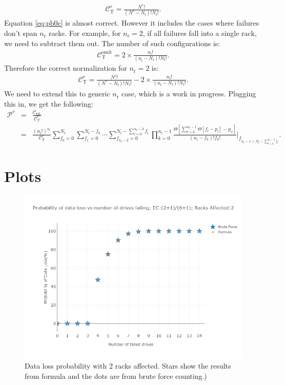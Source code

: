 \documentclass[journal]{IEEEtran}
\begin{document}
\begin{eqnarray}
\mathcal{C}^r_\text{T}=\frac{N^r!}{(N^r-N_\text{f})!N_\text{f}!}.
\label{eq:pb0c}
\end{eqnarray}
Equation \eqref{eq:pb0c} is almost correct. However it includes the cases where failures don't span \(n_\text{r}\) racks.
For example, for \(n_\text{r}=2\), if all failures fall into a single rack, we need to subtract them out. The number of such configurations is:
\begin{eqnarray}
\mathcal{C}^\text{omit}_\text{T}=2\times \frac{n_\text{i}!}{(n_\text{i}-N_\text{f})!N_\text{f}!}.
\label{eq:pb0co}
\end{eqnarray}
Therefore the correct normalization for \(n_\text{r}=2\) is:
\begin{eqnarray}
\mathcal{C}^r_\text{T}=\frac{N^r!}{(N^r-N_\text{f})!N_\text{f}!}-2\times \frac{n_\text{i}!}{(n_\text{i}-N_\text{f})!N_\text{f}!}.
\label{eq:pb0cw}
\end{eqnarray}
We need to extend this to generic \(n_\text{r}\) case, which is a work in progress.
Plugging this in, we get the following:
\begin{eqnarray}
\mathcal{P}^r&=&\frac{\mathcal{C}_\text{DL}}{\mathcal{C}^r_\text{T}}\nonumber\\
&=& \frac{\left(n_\text{i}!\right)^{n_\text{r}}}{ \mathcal{C}^r_\text{T}}  \sum_{f_0=0}^{N_\text{f}}\sum_{f_1=0}^{N_\text{f}-f_0}\cdots \sum_{f_{n_\text{r}-2}=0}^{N_\text{f}-\sum_{l=0}^{n_\text{r}-3}f_l} {\displaystyle \prod_{k=0}^{n_\text{r}-1}} \frac{\Theta\left[  \sum_{l=0}^{n_\text{r}-1}  \Theta \left[f_l-p_\text{i} \right]-p_\text{o}     \right]}{(n_\text{i}-f_k)!f_k!}\bigg\rvert_{f_{ n_\text{r}-1=N_\text{f}-\sum_{l=0}^{n_\text{r}-2}f_l}}.
\label{eq:plossR}
\end{eqnarray}

\hypertarget{plots}{%
\section{Plots}\label{plots}}

\begin{figure}[H]

{\centering \includegraphics[width=0.65\linewidth]{racks} 

}

\caption{Data loss probability  with 2 racks affected. Stars show the results from formula and the dots are from brute force counting.)}\label{fig:racks}
\end{figure}
\end{document}
